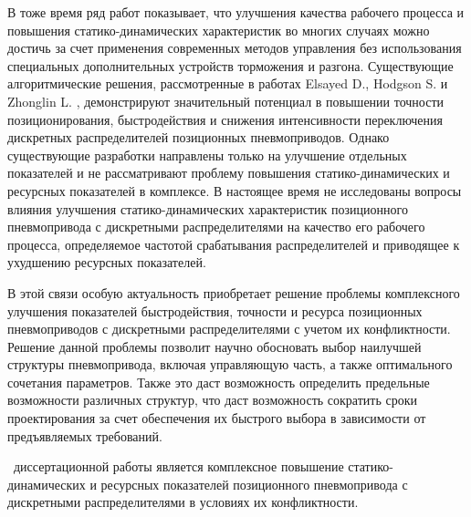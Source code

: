 В тоже время ряд работ \cite{Barth:PWM_pneumatit, Nazari:Position_tracking}
показывает, что улучшения качества рабочего процесса и повышения
статико-динамических характеристик во многих случаях можно достичь за счет применения
современных методов управления без использования специальных дополнительных устройств
торможения и разгона. Существующие алгоритмические решения, рассмотренные в работах
Elsayed D., Hodgson S. и Zhonglin L. \cite{Elsayed,Zhonglin,Hodgson:article1}, демонстрируют значительный потенциал
в повышении точности позиционирования, быстродействия и снижения интенсивности переключения
дискретных распределителей позиционных пневмоприводов. Однако существующие разработки
направлены только на улучшение отдельных показателей и не рассматривают проблему повышения
статико-динамических и ресурсных показателей в комплексе. В настоящее время не исследованы
вопросы влияния улучшения статико-динамических характеристик позиционного пневмопривода с
дискретными распределителями на качество его рабочего процесса, определяемое частотой срабатывания
распределителей и приводящее к ухудшению ресурсных показателей.

В этой связи особую актуальность приобретает решение проблемы комплексного улучшения показателей
быстродействия, точности и ресурса позиционных пневмоприводов с дискретными распределителями с
учетом их конфликтности. Решение данной проблемы позволит научно обосновать выбор наилучшей
структуры пневмопривода, включая управляющую часть, а также оптимального сочетания параметров.
Также это даст возможность определить предельные возможности различных структур, что даст
возможность сократить сроки проектирования за счет обеспечения их быстрого выбора в зависимости
от предъявляемых требований.

\ifsynopsis

\else
\fi


{\aim}~диссертационной работы является комплексное повышение статико-динамических
и ресурсных показателей позиционного пневмопривода с дискретными распределителями в условиях их конфликтности.

